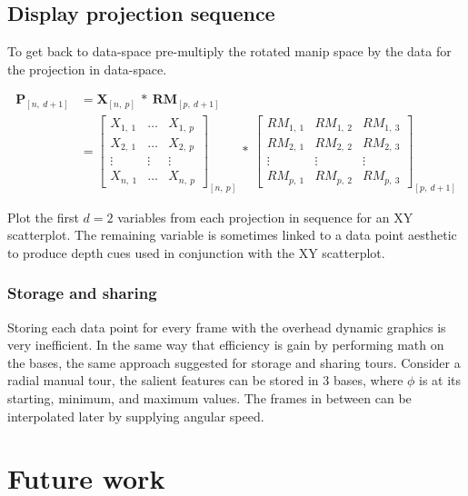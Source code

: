 \documentclass{monashthesis}
\begin{document}
\section{Display projection sequence}\label{display-projection-sequence}

To get back to data-space pre-multiply the rotated manip space by the
data for the projection in data-space.

\begin{align}
  \textbf{P}_{[n,~d+1]}
    &= \textbf{X}_{[n,~p]} ~*~ \textbf{RM}_{[p,~d+1]} \\
    &=
      \begin{bmatrix}
          X_{1,~1} & \dots & X_{1,~p} \\
          X_{2,~1} & \dots & X_{2,~p} \\
          \vdots   & \vdots & \vdots  \\
          X_{n,~1} & \dots & X_{n,~p}
      \end{bmatrix}_{[n,~p]}
      ~*~
      \begin{bmatrix}
        RM_{1,~1} & RM_{1,~2} & RM_{1,~3} \\
        RM_{2,~1} & RM_{2,~2} & RM_{2,~3} \\
        \vdots     & \vdots     & \vdots     \\
        RM_{p,~1} & RM_{p,~2} & RM_{p,~3}
      \end{bmatrix}_{[p,~d+1]}
\end{align}

Plot the first \(d=2\) variables from each projection in sequence for an
XY scatterplot. The remaining variable is sometimes linked to a data
point aesthetic to produce depth cues used in conjunction with the XY
scatterplot.

\subsection{Storage and sharing}\label{storage-and-sharing}

Storing each data point for every frame with the overhead dynamic
graphics is very inefficient. In the same way that efficiency is gain by
performing math on the bases, the same approach suggested for storage
and sharing tours. Consider a radial manual tour, the salient features
can be stored in 3 bases, where \(\phi\) is at its starting, minimum,
and maximum values. The frames in between can be interpolated later by
supplying angular speed.

\chapter{Future work}\label{ch:future_work}
\end{document}
